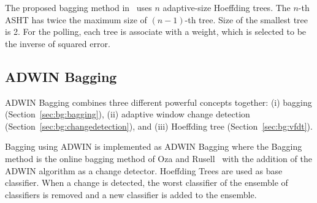 \documentclass[a4paper, 11pt, oneside]{book}
\begin{document}
The proposed bagging method in~\cite{bifet09:asht} uses $n$ adaptive-size Hoeffding trees. The $n$-th ASHT has twice the maximum size of $(n-1)$-th tree. Size of the smallest tree is 2. For the polling, each tree is associate with a weight, which is selected to be the inverse of squared error.

\subsection{ADWIN Bagging}
ADWIN Bagging combines three different powerful concepts together: (i) bagging (Section~\ref{sec:bg:bagging}), (ii) adaptive window change detection (Section~\ref{sec:bg:changedetection}), and (iii) Hoeffding tree (Section~\ref{sec:bg:vfdt}).

Bagging using ADWIN is implemented as ADWIN Bagging where the Bagging method is the online bagging method of Oza and Rusell~\cite{oza01:obagboost} with the addition of the ADWIN algorithm as a change detector. Hoeffding Trees are used as base classifier. When a change is detected, the worst classifier of the ensemble of classifiers is removed and a new classifier is added to the ensemble. 



\end{document}
